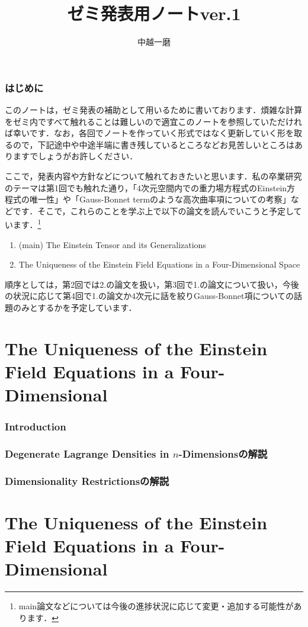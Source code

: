 \documentclass[12pt, a4paper]{jsarticle}
\title{ゼミ発表用ノートver.1}
\author{中越一磨}
\begin{document}
\maketitle

\section{はじめに}
このノートは，ゼミ発表の補助として用いるために書いております．煩雑な計算をゼミ内ですべて触れることは難しいので適宜このノートを参照していただければ幸いです．なお，各回でノートを作っていく形式ではなく更新していく形を取るので，下記途中や中途半端に書き残しているところなどお見苦しいところはありますでしょうがお許しください．

ここで，発表内容や方針などについて触れておきたいと思います．私の卒業研究のテーマは第1回でも触れた通り，「4次元空間内での重力場方程式のEinstein方程式の唯一性」や「Gauss-Bonnet termのような高次曲率項についての考察」などです．そこで，これらのことを学ぶ上で以下の論文を読んでいこうと予定しています．\footnote{main論文などについては今後の進捗状況に応じて変更・追加する可能性があります．}
\begin{enumerate}
  \item (main) The Einstein Tensor and its Generalizations
  \item The Uniqueness of the Einstein Field Equations in a Four-Dimensional Space
\end{enumerate}

順序としては，第2回では2.の論文を扱い，第3回で1.の論文について扱い，今後の状況に応じて第4回で1.の論文か4次元に話を絞りGauss-Bonnet項についての話題のみとするかを予定しています．
\part{The Uniqueness of the Einstein Field Equations in a Four-Dimensional}
\section{Introduction}

\section{Degenerate Lagrange Densities in \(n\)-Dimensionsの解説}

\section{Dimensionality Restrictionsの解説}

\part{The Uniqueness of the Einstein Field Equations in a Four-Dimensional}

\begin{thebibliography}{9}
\end{thebibliography}
\end{document}
